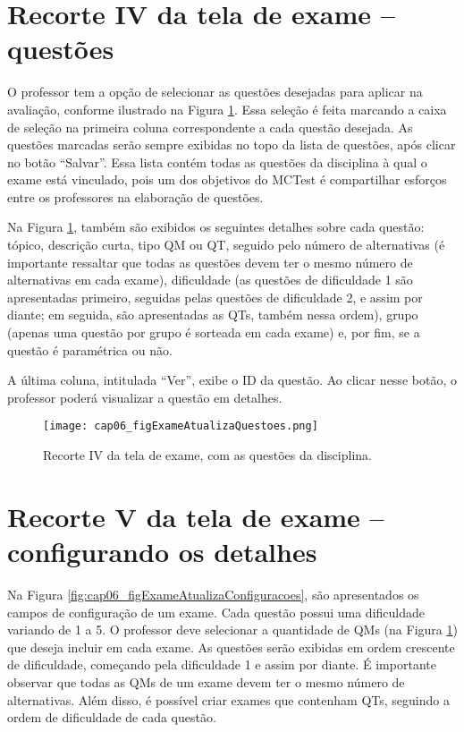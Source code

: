 \section{Recorte IV da tela de exame -- questões}

O professor tem a opção de selecionar as questões desejadas para aplicar na avaliação, conforme ilustrado na Figura \ref{fig:cap06_figExameAtualizaQuestoes}. Essa seleção é feita marcando a caixa de seleção na primeira coluna correspondente a cada questão desejada. As questões marcadas serão sempre exibidas no topo da lista de questões, após clicar no botão ``Salvar''. Essa lista contém todas as questões da disciplina à qual o exame está vinculado, pois um dos objetivos do MCTest é compartilhar esforços entre os professores na elaboração de questões.

Na Figura \ref{fig:cap06_figExameAtualizaQuestoes}, também são exibidos os seguintes detalhes sobre cada questão: tópico, descrição curta, tipo QM ou QT, seguido pelo número de alternativas (é importante ressaltar que todas as questões devem ter o mesmo número de alternativas em cada exame), dificuldade (as questões de dificuldade 1 são apresentadas primeiro, seguidas pelas questões de dificuldade 2, e assim por diante; em seguida, são apresentadas as QTs, também nessa ordem), grupo (apenas uma questão por grupo é sorteada em cada exame) e, por fim, se a questão é paramétrica ou não.

A última coluna, intitulada ``Ver'', exibe o ID da questão. Ao clicar nesse botão, o professor poderá visualizar a questão em detalhes.

\begin{figure}[!t]
  \centering
  \texttt{[image: cap06\_figExameAtualizaQuestoes.png]}
  \caption{Recorte IV da tela de exame, com as questões da disciplina.}
  \label{fig:cap06_figExameAtualizaQuestoes}\vspace{-3mm}
\end{figure}

\section{Recorte V da tela de exame -- configurando os detalhes}\label{sec:exameDetalhes}

Na Figura \ref{fig:cap06_figExameAtualizaConfiguracoes}, são apresentados os campos de configuração de um exame. Cada questão possui uma dificuldade variando de 1 a 5. O professor deve selecionar a quantidade de QMs (na Figura \ref{fig:cap06_figExameAtualizaQuestoes}) que deseja incluir em cada exame. As questões serão exibidas em ordem crescente de dificuldade, começando pela dificuldade 1 e assim por diante. É importante observar que todas as QMs de um exame devem ter o mesmo número de alternativas. Além disso, é possível criar exames que contenham QTs, seguindo a ordem de dificuldade de cada questão.

